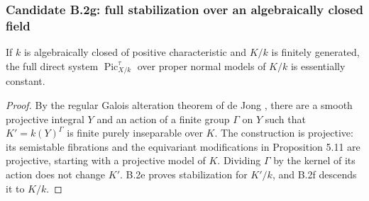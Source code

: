 \subsubsection*{Candidate B.2g: full stabilization over an algebraically closed field}
If $k$ is algebraically closed of positive characteristic and
$K/k$ is finitely generated, the full direct system
$\operatorname{Pic}^{\tau}_{X/k}$ over proper normal models of
$K/k$ is essentially constant.
\begin{proof}
By the regular Galois alteration theorem of de Jong
\cite[Situation 5.3, Theorem 5.13 and Corollary 5.15, pp.~613, 619--620]{deJong1997},
there are a smooth projective integral $Y$ and an action of a
finite group $\Gamma$ on $Y$ such that
$K'=k(Y)^\Gamma$ is finite purely inseparable over $K$.
The construction is projective: its semistable fibrations and
the equivariant modifications in Proposition 5.11 are projective,
starting with a projective model of $K$.
Dividing $\Gamma$ by the kernel of its action does not change
$K'$.  B.2e proves stabilization for $K'/k$, and B.2f descends
it to $K/k$.
\end{proof}
